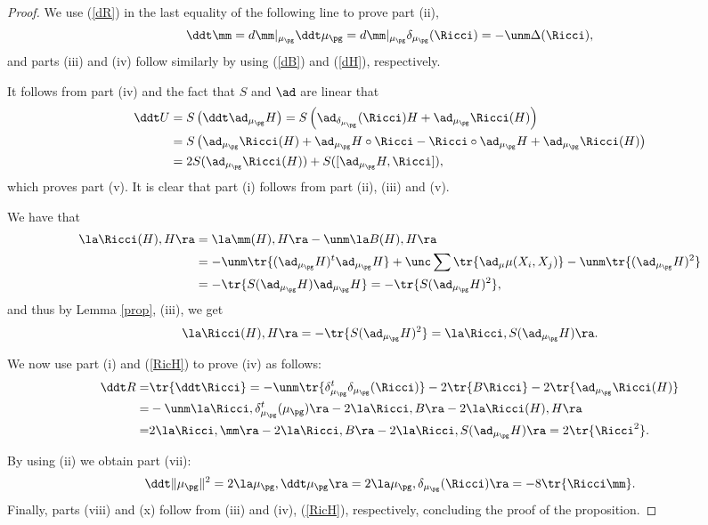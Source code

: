 \documentclass[11pt]{amsart}
\theoremstyle{plain}
\theoremstyle{definition}
\theoremstyle{remark}
\begin{document}
\begin{proof}
We use (\ref{dR}) in the last equality of the following line to prove part (ii),
$$
\ddt\mm= d \mm|_{\mu_{\pg}}\ddt\mu_{\pg} = d \mm|_{\mu_{\pg}}\delta_{\mu_{\pg}}(\Ricci) = -\unm\Delta(\Ricci),
$$
and parts (iii) and (iv) follow similarly by using (\ref{dB}) and (\ref{dH}), respectively.

It follows from part (iv) and the fact that $S$ and $\ad$ are linear that
\begin{align*}
\ddt U &= S\left(\ddt \ad_{\mu_{\pg}}{H}\right) = S\left(\ad_{\delta_{\mu_{\pg}}}(\Ricci){H} + \ad_{\mu_{\pg}}{\Ricci(H)}\right) \\
&= S\left(\ad_{\mu_{\pg}}{\Ricci(H)} + \ad_{\mu_{\pg}}{H}\circ\Ricci - \Ricci\circ\ad_{\mu_{\pg}}{H} + \ad_{\mu_{\pg}}{\Ricci(H)}\right) \\
&= 2S(\ad_{\mu_{\pg}}{\Ricci(H)}) + S([\ad_{\mu_{\pg}}{H},\Ricci]),
\end{align*}
which proves part (v).  It is clear that part (i) follows from part (ii), (iii) and (v).

We have that
\begin{align*}
\la\Ricci(H),H\ra &= \la\mm(H),H\ra-\unm\la B(H),H\ra  \\
&= -\unm\tr{(\ad_{\mu_{\pg}}{H})^t\ad_{\mu_{\pg}}{H}} + \unc\sum\tr{\ad_{\mu}{\mu(X_i,X_j)}} -\unm\tr{(\ad_{\mu_{\pg}}{H})^2} \\
&= -\tr{S(\ad_{\mu_{\pg}}{H})\ad_{\mu_{\pg}}{H}} = -\tr{S(\ad_{\mu_{\pg}}{H})^2},
\end{align*}
and thus by Lemma \ref{prop}, (iii), we get
\begin{equation}\label{RicH}
\la\Ricci(H),H\ra = -\tr{S(\ad_{\mu_{\pg}}{H})^2} = \la\Ricci,S(\ad_{\mu_{\pg}}{H})\ra.
\end{equation}

We now use part (i) and (\ref{RicH}) to prove (iv) as follows:
\begin{align*}
\ddt R =& \tr{\ddt \Ricci} = -\unm\tr{\delta_{\mu_{\pg}}^t\delta_{\mu_{\pg}}(\Ricci)} -2\tr{B\Ricci} -2\tr{\ad_{\mu_{\pg}}{\Ricci(H)}} \\
=& -\unm\la\Ricci,\delta_{\mu_{\pg}}^t(\mu_{\pg})\ra -2\la\Ricci,B\ra -2\la\Ricci(H),H\ra \\
=&  2\la\Ricci,\mm\ra-2\la\Ricci,B\ra-2\la\Ricci,S(\ad_{\mu_{\pg}}{H})\ra =2\tr{\Ricci^2}.
\end{align*}

By using (ii) we obtain part (vii):
$$
\ddt\|\mu_{\pg}\|^2= 2\la\mu_{\pg},\ddt\mu_{\pg}\ra =2\la\mu_{\pg},\delta_{\mu_{\pg}}(\Ricci)\ra = -8\tr{\Ricci\mm}.
$$
Finally, parts (viii) and (x) follow from (iii) and (iv), (\ref{RicH}), respectively, concluding the proof of the proposition.
\end{proof}
\end{document}

